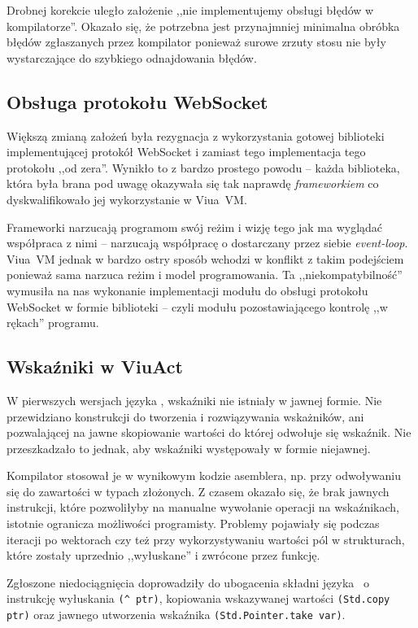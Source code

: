 Drobnej korekcie uległo założenie ,,nie implementujemy obsługi błędów w
kompilatorze''. Okazało się, że potrzebna jest przynajmniej minimalna obróbka
błędów zgłaszanych przez kompilator ponieważ surowe zrzuty stosu nie były
wystarczające do szybkiego odnajdowania błędów.

\subsection{Obsługa protokołu WebSocket}

Większą zmianą założeń była rezygnacja z wykorzystania gotowej biblioteki
implementującej protokół WebSocket i zamiast tego implementacja tego protokołu
,,od zera''. Wynikło to z bardzo prostego powodu -- każda biblioteka, która
była brana pod uwagę okazywała się tak naprawdę \emph{frameworkiem} co
dyskwalifikowało jej wykorzystanie w Viua~VM.

Frameworki narzucają programom swój reżim i wizję tego jak ma wyglądać
współpraca z nimi -- narzucają współpracę o dostarczany przez siebie
\emph{event-loop}. Viua~VM jednak w bardzo ostry sposób wchodzi w konflikt z
takim podejściem ponieważ sama narzuca reżim i model programowania.  Ta
,,niekompatybilność'' wymusiła na nas wykonanie implementacji modułu do obsługi
protokołu WebSocket w formie biblioteki -- czyli modułu pozostawiającego
kontrolę ,,w rękach'' programu.

\subsection{Wskaźniki w ViuAct}

W pierwszych wersjach języka \ViuAct, wskaźniki nie istniały w jawnej formie.
Nie przewidziano konstrukcji do tworzenia i rozwiązywania wskażników, ani
pozwalającej na jawne skopiowanie wartości do której odwołuje się wskaźnik.
Nie przeszkadzało to jednak, aby wskaźniki występowały w formie niejawnej.

Kompilator stosował je w wynikowym kodzie asemblera, np. przy odwoływaniu się do
zawartości w typach złożonych. Z czasem okazało się, że brak jawnych instrukcji,
które pozwoliłyby na manualne wywołanie operacji na wskaźnikach, istotnie
ogranicza możliwości programisty. Problemy pojawiały się podczas iteracji po
wektorach czy też przy wykorzystywaniu wartości pól w strukturach, które zostały
uprzednio ,,wyłuskane'' i zwrócone przez funkcję.

Zgłoszone niedociągnięcia doprowadziły do ubogacenia składni języka \ViuAct\ o
instrukcję wyłuskania \texttt{(\^~ptr)}, kopiowania wskazywanej wartości
\texttt{(Std.copy ptr)} oraz jawnego utworzenia wskaźnika
\texttt{(Std.Pointer.take var)}.

